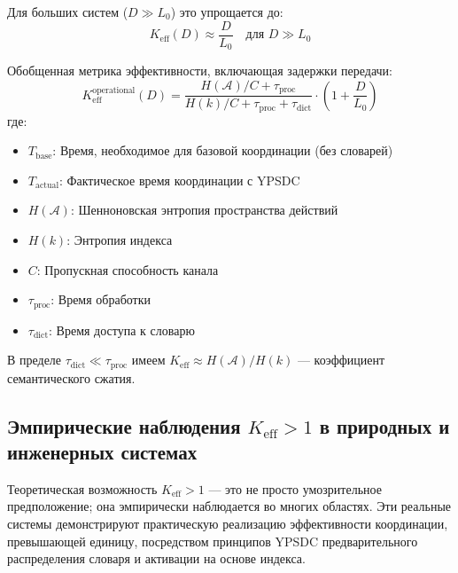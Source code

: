 \documentclass[11pt,a4paper]{article}
\begin{document}
	Для больших систем ($D \gg L_0$) это упрощается до:
	\begin{equation}
		K_{\mathrm{eff}}(D) \approx \frac{D}{L_0} \quad \text{для } D \gg L_0
	\end{equation}
	
	Обобщенная метрика эффективности, включающая задержки передачи:
	\begin{equation}
		K_{\mathrm{eff}}^{\text{operational}}(D) = \frac{H(\mathcal{A})/C + \tau_{\text{proc}}}{H(k)/C + \tau_{\text{proc}} + \tau_{\text{dict}}} \cdot \left(1 + \frac{D}{L_0}\right)
	\end{equation}
	где:
	\begin{itemize}
		\item $T_{\text{base}}$: Время, необходимое для базовой координации (без словарей)
		\item $T_{\text{actual}}$: Фактическое время координации с YPSDC
		\item $H(\mathcal{A})$: Шенноновская энтропия пространства действий
		\item $H(k)$: Энтропия индекса
		\item $C$: Пропускная способность канала
		\item $\tau_{\text{proc}}$: Время обработки
		\item $\tau_{\text{dict}}$: Время доступа к словарю
	\end{itemize}
	
	В пределе $\tau_{\text{dict}} \ll \tau_{\text{proc}}$ имеем $K_{\mathrm{eff}} \approx H(\mathcal{A})/H(k)$ — коэффициент семантического сжатия.
	
	\subsection{Эмпирические наблюдения $K_{\mathrm{eff}} > 1$ в природных и инженерных системах}
	\label{sec:empirical-keff}
	
	Теоретическая возможность $K_{\mathrm{eff}} > 1$ — это не просто умозрительное предположение; она эмпирически наблюдается во многих областях. Эти реальные системы демонстрируют практическую реализацию эффективности координации, превышающей единицу, посредством принципов YPSDC предварительного распределения словаря и активации на основе индекса.
	
\end{document}
